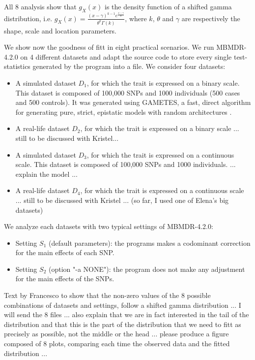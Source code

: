 \documentclass{bmcart}
\begin{document}
All 8 analysis show that $g_X(x)$ is the density function of a shifted gamma distribution, i.e. $g_X(x) = \frac{(x-\gamma)^{k-1}e^{\frac{x-\gamma}{\theta}}}{\theta^k\Gamma(k)}$, where $k$, $\theta$ and $\gamma$ are respectively the shape, scale and location parameters. 

We show now the goodness of fitt in eight practical scenarios. We run MBMDR-4.2.0 on 4 different datasets and adapt the source code to store every single test-statistics generated by the program into a file. We consider four datasets:

\begin{itemize}
\item A simulated dataset $D_1$, for which the trait is expressed on a binary scale. This dataset is composed of 100,000 SNPs and 1000 individuals (500 cases and 500 controls). It was generated using GAMETES, a fast, direct algorithm for generating pure, strict, epistatic models with random architectures \cite{gametes2012}.
\item A real-life dataset $D_2$, for which the trait is expressed on a binary scale ... still to be discussed with Kristel...
\item A simulated dataset $D_3$, for which the trait is expressed on a continuous scale. This dataset is composed of 100,000 SNPs and 1000 individuals. ... explain the model ...
\item A real-life dataset $D_4$, for which the trait is expressed on a continuous scale ... still to be discussed with Kristel ... (so far, I used one of Elena's big datasets)
\end{itemize}

We analyze each datasets with two typical settings of MBMDR-4.2.0:
\begin{itemize}
\item Setting $S_1$ (default parameters): the programs makes a codominant correction for the main effects of each SNP.
\item Setting $S_2$ (option "-a NONE"): the program does not make any adjustment for the main effects of the SNPs.
\end{itemize}

\smallskip

{\color{red} Text by Francesco to show that the non-zero values of the 8 possible combinations of datasets and settings, follow a shifted gamma distribution ... I will send the 8 files ... also explain that we are in fact interested in the tail of the distribution and that this is the part of the distribution that we need to fitt as precisely as possible, not the middle or the head ... please produce a figure composed of 8 plots, comparing each time the observed data and the fitted distribution ...}
\end{document}
